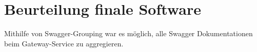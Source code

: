 \section{Beurteilung finale Software}

Mithilfe von Swagger-Grouping war es möglich, alle Swagger Dokumentationen beim Gateway-Service zu aggregieren.  
